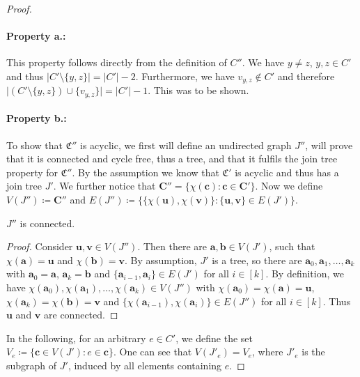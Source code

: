 \begin{proof}
	\paragraph*{Property a.:}
	This property follows directly from the definition of $C''$.
	We have $y\neq z$, $y,z\in C'$ and thus $\vert C'\setminus \{y,z\}\vert = \vert C'\vert -2$.
	Furthermore, we have $v_{y,z}\notin C'$ and therefore $\vert (C'\setminus \{y,z\})\cup \{v_{y,z}\}\vert = \vert C' \vert -1$.
	This was to be shown.
	
	\paragraph*{Property b.:}
	To show that $\mathfrak C''$ is acyclic, we first will define an undirected graph $J''$, will prove that it is connected and cycle free, thus a tree, and that it fulfils the join tree property for $\mathfrak C''$.
	By the assumption we know that $\mathfrak C'$ is acyclic and thus has a join tree $J'$.
	We further notice that $\mathbf{C''}=\{\chi(\mathbf c) : \mathbf c\in \mathbf{C'}\}$.
	Now we define $V(J'')\coloneqq \mathbf{C''}$ and $E(J'')\coloneqq \{\{\chi(\mathbf u),\chi(\mathbf v)\} : \{\mathbf u,\mathbf v\}\in E(J')\}$.
	
	\begin{claim}
		$J''$ is connected.
	\end{claim}
	\begin{proof}
		Consider $\mathbf u,\mathbf v\in V(J'')$.
		Then there are $\mathbf a,\mathbf b\in V(J')$, such that $\chi(\mathbf a)=\mathbf u$ and $\chi(\mathbf b)=\mathbf v$.
		By assumption, $J'$ is a tree, so there are $\mathbf a_0,\mathbf a_1,\dots,\mathbf a_k$ with $\mathbf a_0=\mathbf a$, $\mathbf a_k=\mathbf b$ and $\{\mathbf a_{i-1},\mathbf a_{i}\}\in E(J')$ for all $i\in [k]$.
		By definition, we have $\chi(\mathbf a_0),\chi(\mathbf a_1),\dots,\chi(\mathbf a_k)\in V(J'')$ with $\chi(\mathbf a_0)=\chi(\mathbf a)=\mathbf u$, $\chi(\mathbf a_k)=\chi(\mathbf b)=\mathbf v$ and $\{\chi(\mathbf a_{i-1}),\chi(\mathbf a_i)\}\in E(J'')$ for all $i\in[k]$.
		Thus $\mathbf u$ and $\mathbf v$ are connected.
	\end{proof}
	
	In the following, for an arbitrary $e \in C'$, we define the set $V_e\coloneqq \{\mathbf c\in V(J') : e\in \mathbf c\}$.
	One can see that $V(J'_e)=V_e$, where $J'_e$ is the subgraph of $J'$, induced by all elements containing $e$.
	

\end{proof}
